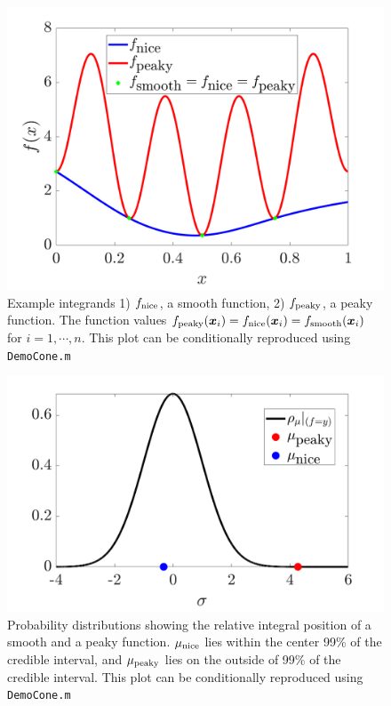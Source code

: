 \documentclass{svjour3}                     %
\newcommand{\bm}[1]{\boldsymbol{#1}}
\newcommand{\vx}{\bm{x}}
\newcommand{\NICE}{\textup{nice}}
\newcommand{\PEAKY}{\textup{peaky}}
\newcommand{\TRUE}{\textup{smooth}}
\newcommand{\code}[1]{\texttt{#1}}
\newcommand{\JRNote}[1]{{\textcolor{green}{JR: #1}}}
\begin{document}
\begin{figure}[ht]
	\centering
	\includegraphics[width=0.8\linewidth]{figures/cone_bayes_f_real}
	\caption{Example integrands 1) $f_{\NICE}$, a smooth function, 2) $f_{\PEAKY}$, a peaky function. The function values $f_{\PEAKY}(\vx_i) = f_{\NICE}(\vx_i) = f_{\TRUE}(\vx_i) $ for $i=1, \cdots, n$. This plot can be conditionally reproduced using \code{DemoCone.m} \cite{ChoEtal20a}}
	\label{fig:cone_bayes_functions}
\end{figure}
\begin{figure}[ht]
	\centering
	\includegraphics[width=0.8\linewidth]{figures/cone_bayes_mu_pdf}
	\caption{Probability distributions showing the relative integral position of a smooth and a peaky function. $\mu_{\NICE}$ lies within the center 99\% of the credible interval, and $\mu_{\PEAKY}$ lies on the outside of 99\% of  the credible interval. This plot can be conditionally reproduced using \code{DemoCone.m} \cite{ChoEtal20a}}
	\label{fig:cone_bayes_posterior}
\end{figure}
\end{document}
